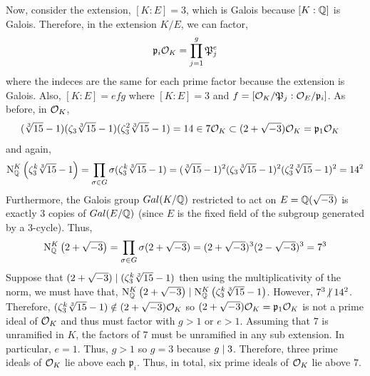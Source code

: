 \documentclass[12pt]{extarticle}
\begin{document}
\begin{enumerate}
\begin{enumerate}
Now, consider the extension, $[K : E] = 3$, which is Galois because $[K : \mathbb{Q}]$ is Galois. Therefore, in the extension $K/E$, we can factor,
\[ \mathfrak{p}_i \mathcal{O}_{K} = \prod_{j = 1}^g \mathfrak{P}_j^{e}\]
where the indeces are the same for each prime factor because the extension is Galois. Also, $[K : E] = efg$ where $[K : E] = 3$ and $f = [\mathcal{O}_{K}/\mathfrak{P}_j : \mathcal{O}_{E}/\mathfrak{p}_i]$. As before, in $\mathcal{O}_{K}$, 
\begin{align*}
(\sqrt[3]{15} - 1)& ( \zeta_3 \sqrt[3]{15} - 1)(\zeta_3^2 \sqrt[3]{15} - 1) = 14 \in 7 \mathcal{O}_{K} \subset (2 + \sqrt{-3}) \mathcal{O}_{K} = \mathfrak{p}_1 \mathcal{O}_{K}
\end{align*}
and again,
\[ \mathrm{N}^{K}_{\mathbb{Q}}\left(\zeta_3^k \sqrt[3]{15} - 1\right) = \prod_{\sigma \in G} \sigma(\zeta_3^k \sqrt[3]{15} - 1) = (\sqrt[3]{15} - 1)^2( \zeta_3 \sqrt[3]{15} - 1)^2(\zeta_3^2 \sqrt[3]{15} - 1)^2 = 14^2\]
Furthermore, the Galois group $Gal \small(K/\mathbb{Q} \small)$ restricted to act on $E = \mathbb{Q}(\sqrt{-3})$ is exactly $3$ copies of $Gal \small(E/\mathbb{Q} \small)$ (since $E$ is the fixed field of the subgroup generated by a 3-cycle). Thus,
\[\mathrm{N}^{K}_{\mathbb{Q}}\left(2 + \sqrt{-3}\right) = \prod\limits_{\sigma \in G} \sigma(2 + \sqrt{-3}) = (2 + \sqrt{-3})^3 (2 - \sqrt{-3})^3 = 7^3 \]
Suppose that $(2 + \sqrt{-3}) \mid (\zeta_3^k \sqrt[3]{15} - 1)$ then using the multiplicativity of the norm, we must have that, $\mathrm{N}^{K}_{\mathbb{Q}}\left(2 + \sqrt{-3}\right) \mid \mathrm{N}^{K}_{\mathbb{Q}}\left(\zeta_3^k \sqrt[3]{15} - 1\right)$. However, $7^3 \ndivides 14^2$. Therefore, $(\zeta_3^k \sqrt[3]{15} - 1) \notin (2 + \sqrt{-3}) \mathcal{O}_{K}$ so $(2 + \sqrt{-3}) \mathcal{O}_{K} = \mathfrak{p}_1 \mathcal{O}_{K}$ is not a prime ideal of $\mathcal{O}_{K}$ and thus must factor with $g > 1$ or $e > 1$. Assuming that $7$ is unramified in $K$, the factors of $7$ must be unramified in any sub extension. In particular, $e = 1$. Thus, $g > 1$ so $g = 3$ because $g \mid 3$. Therefore, three prime ideals of $\mathcal{O}_{K}$ lie above each $\mathfrak{p}_i$. Thus, in total, six prime ideals of $\mathcal{O}_{K}$ lie above $7$.    


\end{enumerate}
\end{enumerate}
\end{document}
